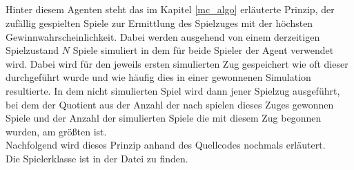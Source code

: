 \subsection{\mc}
Hinter diesem Agenten steht das im Kapitel \ref{mc_algo} erläuterte Prinzip, der zufällig gespielten Spiele zur Ermittlung des Spielzuges mit der höchsten Gewinnwahrscheinlichkeit. Dabei werden ausgehend von einem derzeitigen Spielzustand $N$ Spiele simuliert in dem für beide Spieler der Agent  verwendet wird. Dabei wird für den jeweils ersten simulierten Zug gespeichert wie oft dieser durchgeführt wurde und wie häufig dies in einer gewonnenen Simulation resultierte. In dem nicht simulierten Spiel wird dann jener Spielzug ausgeführt, bei dem der Quotient aus der Anzahl der nach spielen dieses Zuges gewonnen Spiele und der Anzahl der simulierten Spiele die mit diesem Zug begonnen wurden, am größten ist.
\\Nachfolgend wird dieses Prinzip anhand des Quellcodes nochmals erläutert.
\\Die Spielerklasse  ist in der Datei  zu finden.
